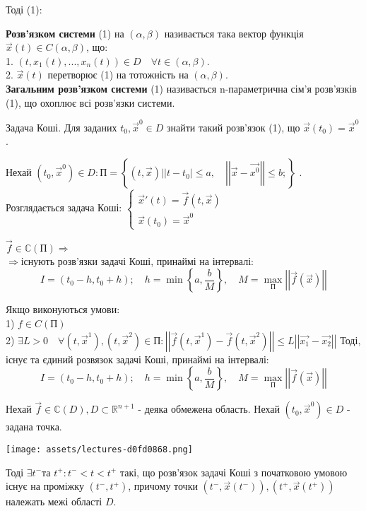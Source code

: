 \documentclass[14pt,a4paper]{scrartcl}
\theoremstyle{definition}
\theoremstyle{remark}
\theoremstyle{definition}
\theoremstyle{definition}
\begin{document}
Тоді (1): 
\ed

\def\rect{\textbf{П}}
\bd
\textbf{Розв'язком системи } (1) на $(\alpha , \beta)$ називається така вектор функція $\vec{x} (t) \in C(\alpha , \beta)$, що:\\
1. $(t, x_1 (t), ..., x_n(t))  \in D \quad \forall t \in (\alpha , \beta)$. \\
2. $ \vec{x} (t)$ перетворює (1) на тотожність на $(\alpha , \beta)$. \\
\textbf{Загальним розв'язком системи}  (1) називається n-параметрична сім'я розв'язків (1), що охоплює всі розв'язки системи.
\ed

Задача Коші. Для заданих $t_0, \vec{x}^{0} \in D$ знайти такий розв'язок (1), що $\vec{x} (t_0) = \vec{x}^{0}$.

Нехай $(t_0 , \vec{x}^0) \in D :  \textbf{П} = \left\lbrace (t, \vec{x}) \bigg |
 \left| t - t_0 \right| \leq a, \quad
 \left| \left| \vec{x} - \vec{x^{0}} \right|  \right| \leq  b;
 \right\rbrace $ .\\
 Розглядається задача Коші: $\begin{cases}
      \vec{x} ' (t)  =  \vec{f} (t, \vec{x}) \\
      \vec{x} (t_0) = \vec{x}^0
 \end{cases}$
\begin{boxteo}
$\vec{f} \in \mathbb{C} (\rect) \Longrightarrow $\\$  \Longrightarrow $існують розв'язки задачі Коші, принаймі на інтервалі: $$ I = (t_0 - h, t_0 + h); \quad h = \min{\left\lbrace a , \frac{b}{M}  \right\rbrace }, \quad M = \max_{\rect} \left| \left| \vec{f} (\vec{x}) \right|  \right| $$
\end{boxteo}
\begin{boxteo} Якщо виконуються умови:\\
    1) $f \in C (\rect)$ \\
    2) $ \exists L > 0 \quad \forall (t, \vec{x}^1 ), (t, \vec{x} ^2) \in \rect  :
    \left| \left| \vec{f} (t, \vec{x}^1) - \vec{f} (t, \vec{x}^2)  \right|   \right|  \leq  L \left|  \left| \vec{x_1} - \vec{x_2} \right|  \right| $
    Тоді, існує та єдиний розвязок задачі Коші, принаймі на інтервалі: $$ I = (t_0 - h, t_0 + h); \quad h = \min{\left\lbrace a , \frac{b}{M}  \right\rbrace }, \quad M = \max_{\rect} \left| \left| \vec{f} (\vec{x}) \right|  \right| $$
\end{boxteo}

\begin{boxteo}
    Нехай $\vec{f} \in \mathbb{C}(D), D \subset \mathbb{R}^{n+1}$ - деяка обмежена область. Нехай $(t_0, \vec{x}^0) \in D$ - задана точка.

    \begin{center} \texttt{[image: assets/lectures-d0fd0868.png]} \end{center}
    Тоді $\exists t^{-} $та  $t^{+} :  t^{-} < t < t^{+}$ такі, що розв'язок задачі Коші з початковою умовою існує на проміжку $ (t^{-}, t^{+})$, причому точки $ (t^-, \vec{x} (t^-)), (t^+, \vec{x} (t^+))$ належать межі області $D$.
\end{boxteo}
\end{document}
